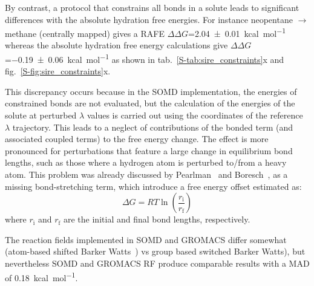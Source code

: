 \documentclass[journal=jctcce,manuscript=article]{achemso}
\begin{document}
By contrast, a protocol that constrains all bonds in a solute leads to 
significant differences with the absolute hydration free energies. For instance 
neopentane $\rightarrow$ methane (centrally mapped) gives a RAFE
$\Delta\Delta G$=\SI{2.04 +- 0.01}{kcal.mol^{-1}}  whereas the absolute 
hydration free energy calculations give $\Delta\Delta 
G$=\SI{-0.19+-0.06}{kcal.mol^{-1}} as shown in 
tab.~\ref{S-tab:sire_constraints}x and fig.~\ref{S-fig:sire_constraints}x.

This discrepancy occurs because in the SOMD implementation, the energies of 
constrained bonds are not evaluated, but the calculation of the energies of the 
solute at perturbed $\lambda$ values is carried out using the coordinates of 
the reference $\lambda$ trajectory. This leads to a neglect of contributions of 
the bonded term (and associated coupled terms) to the free energy change. The 
effect is more pronounced for perturbations that feature a large change in 
equilibrium bond lengths, such as those where a hydrogen atom is perturbed to/from a heavy atom.
This problem was already discussed by Pearlman~\cite{pearlman1991overlooked} 
and Boresch~\cite{doi:10.1021/jp981628n, doi:10.1021/jp981629f}, as a missing 
bond-stretching term, which introduce a free energy offset estimated as:
\begin{equation}
 \label{eq:allbondserror}
 \Delta G= RT\ln \left ( \frac{r_{\mathrm{i}}}{r_\mathrm{f}} \right)  
\end{equation}
where $r_{\mathrm{i}}$ and $r_{\mathrm{f}}$ are the initial and final bond 
lengths, respectively. 

The reaction fields implemented in SOMD and GROMACS differ somewhat (atom-based 
shifted Barker Watts~\cite{doi:10.1080/00268977300102101}) vs group based 
switched Barker Watts), but nevertheless SOMD and GROMACS RF produce comparable 
results with a MAD of \SI{0.18}{kcal.mol^{-1}}.
\end{document}
